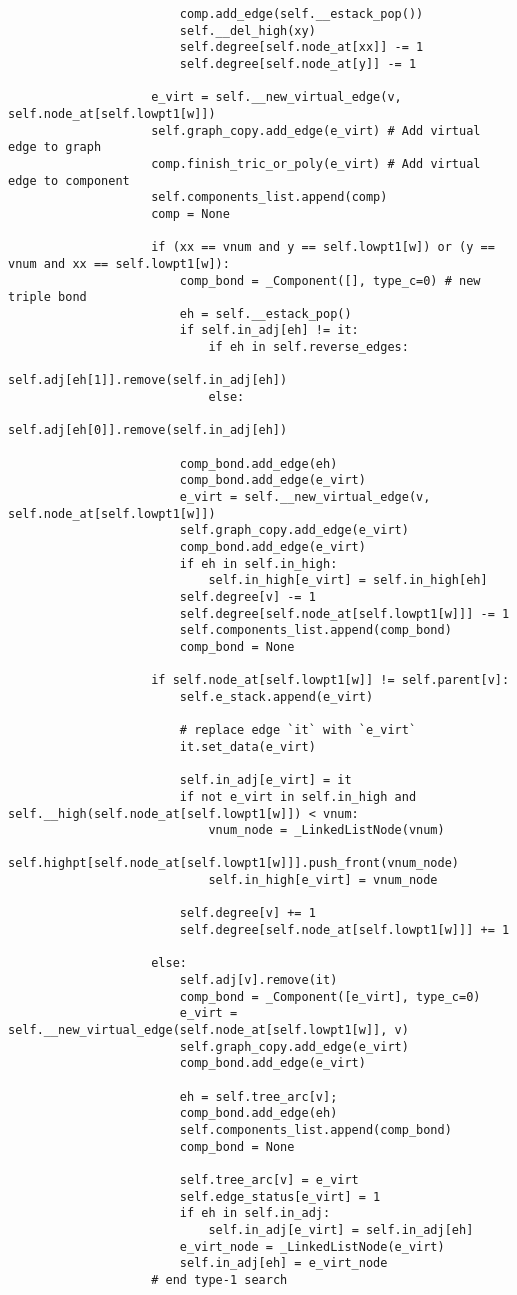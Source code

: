 \begin{center}
\begin{verbatim}
						comp.add_edge(self.__estack_pop())
						self.__del_high(xy)
						self.degree[self.node_at[xx]] -= 1
						self.degree[self.node_at[y]] -= 1

					e_virt = self.__new_virtual_edge(v, self.node_at[self.lowpt1[w]])
					self.graph_copy.add_edge(e_virt) # Add virtual edge to graph
					comp.finish_tric_or_poly(e_virt) # Add virtual edge to component
					self.components_list.append(comp)
					comp = None

					if (xx == vnum and y == self.lowpt1[w]) or (y == vnum and xx == self.lowpt1[w]):
						comp_bond = _Component([], type_c=0) # new triple bond
						eh = self.__estack_pop()
						if self.in_adj[eh] != it:
							if eh in self.reverse_edges:
								self.adj[eh[1]].remove(self.in_adj[eh])
							else:
								self.adj[eh[0]].remove(self.in_adj[eh])

						comp_bond.add_edge(eh)
						comp_bond.add_edge(e_virt)
						e_virt = self.__new_virtual_edge(v, self.node_at[self.lowpt1[w]])
						self.graph_copy.add_edge(e_virt)
						comp_bond.add_edge(e_virt)
						if eh in self.in_high:
							self.in_high[e_virt] = self.in_high[eh]
						self.degree[v] -= 1
						self.degree[self.node_at[self.lowpt1[w]]] -= 1
						self.components_list.append(comp_bond)
						comp_bond = None

					if self.node_at[self.lowpt1[w]] != self.parent[v]:
						self.e_stack.append(e_virt)

						# replace edge `it` with `e_virt`
						it.set_data(e_virt)

						self.in_adj[e_virt] = it
						if not e_virt in self.in_high and self.__high(self.node_at[self.lowpt1[w]]) < vnum:
							vnum_node = _LinkedListNode(vnum)
							self.highpt[self.node_at[self.lowpt1[w]]].push_front(vnum_node)
							self.in_high[e_virt] = vnum_node

						self.degree[v] += 1
						self.degree[self.node_at[self.lowpt1[w]]] += 1

					else:
						self.adj[v].remove(it)
						comp_bond = _Component([e_virt], type_c=0)
						e_virt = self.__new_virtual_edge(self.node_at[self.lowpt1[w]], v)
						self.graph_copy.add_edge(e_virt)
						comp_bond.add_edge(e_virt)

						eh = self.tree_arc[v];
						comp_bond.add_edge(eh)
						self.components_list.append(comp_bond)
						comp_bond = None

						self.tree_arc[v] = e_virt
						self.edge_status[e_virt] = 1
						if eh in self.in_adj:
							self.in_adj[e_virt] = self.in_adj[eh]
						e_virt_node = _LinkedListNode(e_virt)
						self.in_adj[eh] = e_virt_node
					# end type-1 search


\end{verbatim}
\end{center}

